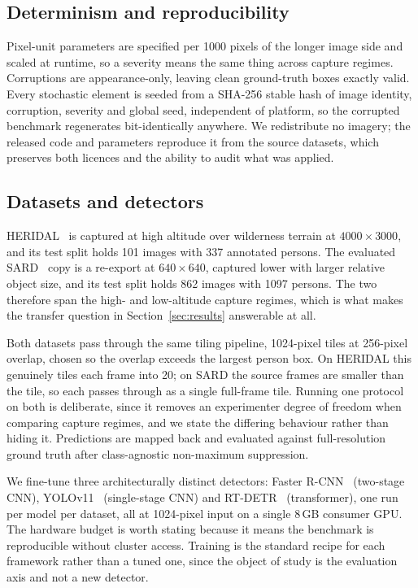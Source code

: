 \subsection{Determinism and reproducibility}

Pixel-unit parameters are specified per 1000 pixels of the longer image
side and scaled at runtime, so a severity means the same thing across
capture regimes. Corruptions are appearance-only, leaving clean
ground-truth boxes exactly valid. Every stochastic element is seeded
from a SHA-256 stable hash of image identity, corruption, severity and
global seed, independent of platform, so the corrupted benchmark
regenerates bit-identically anywhere. We redistribute no imagery; the
released code and parameters reproduce it from the source datasets,
which preserves both licences and the ability to audit what was applied.

\subsection{Datasets and detectors}

HERIDAL~\cite{bozic2019heridal} is captured at high altitude over
wilderness terrain at $4000 \times 3000$, and its test split holds 101
images with 337 annotated persons. The evaluated SARD~\cite{sambolek2021sard}
copy is a re-export at $640 \times 640$, captured lower with larger
relative object size, and its test split holds 862 images with 1097
persons. The two therefore span the high- and low-altitude capture
regimes, which is what makes the transfer question in
Section~\ref{sec:results} answerable at all.

Both datasets pass through the same tiling pipeline, 1024-pixel tiles at
256-pixel overlap, chosen so the overlap exceeds the largest person box.
On HERIDAL this genuinely tiles each frame into 20; on SARD the source
frames are smaller than the tile, so each passes through as a single
full-frame tile. Running one protocol on both is deliberate, since it
removes an experimenter degree of freedom when comparing capture
regimes, and we state the differing behaviour rather than hiding it.
Predictions are mapped back and evaluated against full-resolution ground
truth after class-agnostic non-maximum suppression.

We fine-tune three architecturally distinct detectors: Faster
R-CNN~\cite{ren2015fasterrcnn} (two-stage CNN),
YOLOv11~\cite{ultralytics2024yolo11} (single-stage CNN) and
RT-DETR~\cite{zhao2024rtdetr} (transformer), one run per model per
dataset, all at 1024-pixel input on a single 8\,GB consumer GPU. The
hardware budget is worth stating because it means the benchmark is
reproducible without cluster access. Training is the standard recipe for
each framework rather than a tuned one, since the object of study is the
evaluation axis and not a new detector.

